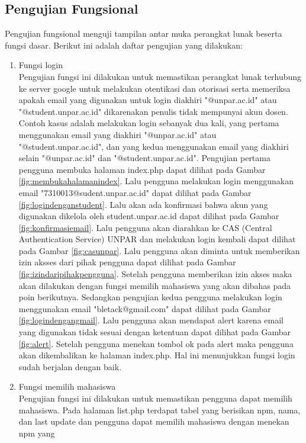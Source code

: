 \subsection{Pengujian Fungsional}
\label{sec:pengujianfungsional}
Pengujian fungsional menguji tampilan antar muka perangkat lunak beserta fungsi
dasar. Berikut ini adalah daftar pengujian yang dilakukan:
\begin{enumerate}[(1)]
\item Fungsi login\\
	Pengujian fungsi ini dilakukan untuk memastikan perangkat lunak terhubung ke
	server google untuk melakukan otentikasi dan otorisasi serta memeriksa apakah
	email yang digunakan untuk login diakhiri "@unpar.ac.id" atau
	"@student.unpar.ac.id" dikarenakan penulis tidak mempunyai akun dosen. Contoh
	kasus adalah melakukan login sebanyak dua kali, yang pertama menggunakan email
	yang diakhiri "@unpar.ac.id" atau "@student.unpar.ac.id", dan yang kedua
	menggunakan email yang diakhiri selain "@unpar.ac.id" dan
	"@student.unpar.ac.id". Pengujian pertama pengguna membuka halaman index.php
	dapat dilihat pada Gambar \ref{fig:membukahalamanindex}. Lalu pengguna melakukan
	login menggunakan email "7310013@sudent.unpar.ac.id" dapat dilihat pada Gambar
	\ref{fig:logindenganstudent}. Lalu akan ada konfirmasi bahwa akun yang digunakan
	dikelola oleh student.unpar.ac.id dapat dilihat pada Gambar
	\ref{fig:konfirmasiemail}. Lalu pengguna akan diarahkan ke CAS (Central
	Authentication Service) UNPAR dan melakukan login kembali dapat dilihat pada
	Gambar \ref{fig:casunpar}. Lalu pengguna akan diminta untuk memberikan izin
	aksses dari pihak pengguna dapat dilihat pada Gambar
	\ref{fig:izindaripihakpengguna}. Setelah pengguna memberikan izin akses maka
	akan dilakukan dengan fungsi memilih mahasiswa yang akan dibahas pada poin
	berikutnya. Sedangkan pengujian kedua pengguna melakukan login menggunakan
	email "bletack@gmail.com" dapat dilihat pada Gambar \ref{fig:logindengangmail}.
	Lalu pengguna akan mendapat alert karena email yang digunakan tidak sesuai
	dengan ketentuan dapat dilihat pada Gambar \ref{fig:alert}. Setelah pengguna
	menekan tombol ok pada alert maka pengguna akan dikembalikan ke halaman
	index.php. Hal ini menunjukkan fungsi login sudah berjalan dengan baik.
\item Fungsi memilih mahasiswa\\
	Pengujian fungsi ini dilakukan untuk memastikan pengguna dapat memilih
	mahasiswa. Pada halaman list.php terdapat tabel yang berisikan npm, nama, dan
	last update dan pengguna dapat memilih mahasiswa dengan menekan npm yang

\end{enumerate}
